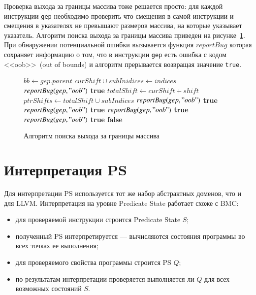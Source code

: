 Проверка выхода за границы массива тоже решается просто: для каждой инструкции
\texttt{gep} необходимо проверить что смещения в самой инструкции и смещения в 
указателях не превышают размеров массива, на которые указывает указатель. 
Алгоритм поиска выхода за границы массива приведен на 
рисунке~\ref{image:oobChecker}. При обнаружении потенциальной ошибки вызывается
функция $reportBug$ которая сохраняет информацию о том, что в инструкции 
\texttt{gep} есть ошибка с кодом <<oob>>~(out of bounds) и алгоритм 
прерывается возвращая значение \texttt{true}.
\begin{figure}[h!]
\begin{algorithmic}[1]
\State $bb \gets gep.parent$
\State $curShift \cup subInidices \gets indices$
    \State $reportBug(gep, "oob")$
    \State \Return \textbf{true}
            \State $totalShift \gets curShift + shift$
            \State $ptrShifts \gets totalShift \cup subIndices$
                \State $reportBug(gep, "oob")$
                \State \Return \textbf{true}
            \EndIf
        \EndFor
    \EndFor
{}
        \State $reportBug(gep, "oob")$
        \State \Return \textbf{true}
    \EndIf
        \State $reportBug(gep, "oob")$
        \State \Return \textbf{true}
    \EndIf
            \State $reportBug(gep, "oob")$
            \State \Return \textbf{true}
        \EndIf
    \EndFor
\EndIf
\State \Return \textbf{false}    
\EndFunction
\end{algorithmic}
\caption{Алгоритм поиска выхода за границы массива}
\label{image:oobChecker}
\end{figure}

\section{Интерпретация PS}
Для интерпретации PS используется тот же набор абстрактных доменов, что и для 
LLVM. Интерпретация на уровне Predicate State работает схоже с BMC:
\begin{itemize}
\item для проверяемой инструкции строится Predicate State $S$;
\item полученный PS интерпретируется --- вычисляются состояния программы
во всех точках ее выполнения;
\item для проверяемого свойства программы строится PS $Q$;
\item по результатам интерпретации проверяется выполняется ли $Q$ для всех 
возможных состояний $S$.
\end{itemize}

